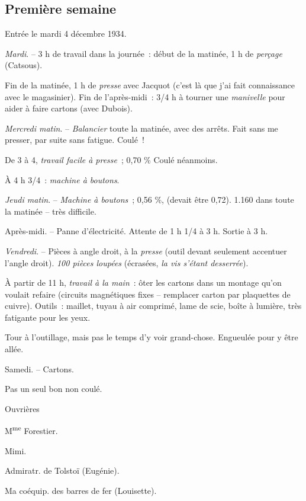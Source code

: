 \documentclass[french,twoside]{book} %
\begin{document}
\subsection[Première semaine]{Première semaine}
\noindent \par
Entrée le mardi 4 décembre 1934.\par
{\itshape Mardi}. – 3 h de travail dans la journée : début de la matinée, 1 h de {\itshape perçage} (Catsous).\par
Fin de la matinée, 1 h de {\itshape presse} avec Jacquot (c'est là que j'ai fait connaissance avec le magasinier). Fin de l'après-midi : 3/4 h à tourner une {\itshape manivelle} pour aider à faire cartons (avec Dubois).\par
{\itshape Mercredi matin}. – {\itshape Balancier} toute la matinée, avec des arrêts. Fait sans me presser, par suite sans fatigue. Coulé !\par
De 3 à 4, {\itshape travail facile à presse} ; 0,70 \% Coulé néanmoins.\par
À 4 h 3/4 : {\itshape machine à boutons}.\par
{\itshape Jeudi matin}. – {\itshape Machine à boutons} ; 0,56 \%, (devait être 0,72). 1.160 dans toute la matinée – très difficile.\par
Après-midi. – Panne d'électricité. Attente de 1 h 1/4 à 3 h. Sortie à 3 h.\par
{\itshape Vendredi}. – Pièces à angle droit, à la {\itshape presse} (outil devant seulement accentuer l'angle droit). {\itshape 100 pièces loupées} (écrasées, {\itshape la vis s'étant desserrée}).\par
À partir de 11 h, {\itshape travail à la main} : ôter les cartons dans un montage qu'on voulait refaire (circuits magnétiques fixes – remplacer carton par plaquettes de cuivre). Outils : maillet, tuyau à air comprimé, lame de scie, boîte à lumière, très fatigante pour les yeux.\par
Tour à l'outillage, mais pas le temps d'y voir grand-chose. Engueulée pour y être allée.\par
Samedi. – Cartons.\par
Pas un seul bon non coulé.\par
Ouvrières\par
M\textsuperscript{me} Forestier.\par
Mimi.\par
Admiratr. de Tolstoï (Eugénie).\par
Ma coéquip. des barres de fer (Louisette).\par
\end{document}

